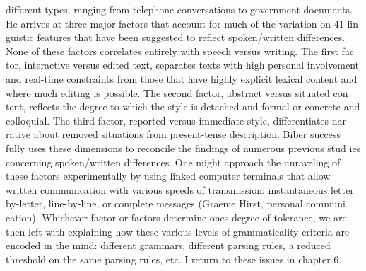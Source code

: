 \clearpage\setcounter{page}{1}\begin{styleStandard}
different types, ranging from telephone conversations to government documents. He arrives at three major factors that account for much of the variation on 41 lin\- guistic features that have been suggested to reflect spoken/written differences. None of these factors correlates entirely with speech versus writing. The first fac\- tor, interactive versus edited text, separates texts with high personal involvement and real-time constraints from those that have highly explicit lexical content and where much editing is possible. The second factor, abstract versus situated con\- tent, reflects the degree to which the style is detached and formal or concrete and colloquial. The third factor, reported versus immediate style, differentiates nar\- rative about removed situations from present-tense description. Biber success\- fully uses these dimensions to reconcile the findings of numerous previous stud\- ies concerning spoken/written differences. One might approach the unraveling of these factors experimentally by using linked computer terminals that allow written communication with various speeds of transmission: instantaneous letter\- by-letter, line-by-line, or complete messages (Graeme Hirst, personal communi\- cation). Whichever factor or factors determine one{\textquotesingle}s degree of tolerance, we are then left with explaining how these various levels of grammaticality criteria are encoded in the mind: different grammars, different parsing rules, a reduced threshold on the same parsing rules, etc. I return to these issues in chapter 6.
\end{styleStandard}


